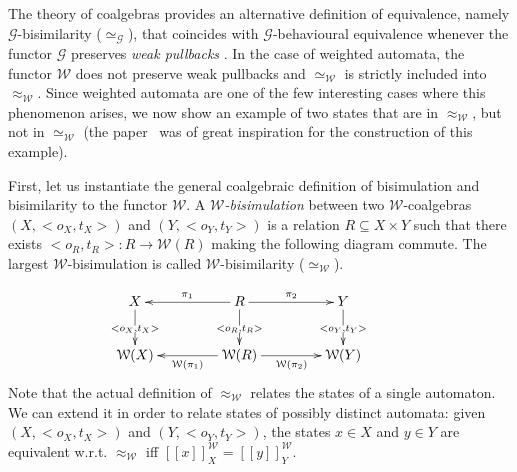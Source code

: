 \documentclass[3p]{elsarticle}
\newcommand{\cbox}[1]{\vspace{0.2cm}\noindent
  \fbox{\parbox{.97\textwidth}{#1}}\vspace{0.2cm}}
\newcommand{\fG}{\mathcal{G}}    %
\newcommand{\fW}{\mathcal{W}}    %
\newcommand{\setproduct}{\times} %
\newcommand{\beh}[3]{\left[\!\left[ #1 \right]\!\right]^{#2}_{#3}} %
\newcommand{\comp}{\circ}               %
\begin{document}
The theory of coalgebras provides an alternative definition of
equivalence, namely $\fG$-bisimilarity ($\simeq_\fG$), that
coincides with $\fG$-behavioural equivalence whenever the functor
$\fG$ preserves \emph{weak pullbacks} \cite{Rutten00}. In the case
of weighted automata, the functor $\fW$ does not preserve weak
pullbacks and $\simeq_\fW$ is strictly included into $\approx_\fW$.
%
Since weighted automata are one of the few interesting cases where
this phenomenon arises, we now show an example of two states that
are in $\approx_\fW$, but not in $\simeq_\fW$ (the paper~\cite{Gumm09}
was of great inspiration for the construction of this example).




%
First, let us instantiate the general coalgebraic definition of
bisimulation and bisimilarity to the functor $\fW$. A
\emph{$\fW$-bisimulation} between two $\fW$-coalgebras
$(X,<o_X,t_X>)$ and $(Y,<o_Y, t_Y>)$ is a relation $R\subseteq
X\setproduct Y$ such that there exists $<o_R,t_R>\colon R\to \fW(R)$
making the following diagram commute. The largest $\fW$-bisimulation
is called $\fW$-bisimilarity ($\simeq_\fW$).

%
\[
\xymatrix@C=1.5cm{X \ar[d]|{<o_X,t_X>}& R \ar[l]_{\pi_1} \ar[d]|{<o_R,t_R>} \ar[r]^{\pi_2}& Y\ar[d]|{<o_Y,t_Y>}\\
\fW(X) & \fW(R) \ar[l]^{\fW(\pi_1)} \ar[r]_{\fW(\pi_2)}& \fW(Y)}\ \
\ \ \ \ \ \ \
\]
%
Note that the actual definition of $\approx_{\fW}$ relates the states
of a single automaton. We can extend it in order to relate
states of possibly distinct automata: given $(X,<o_X,t_X>)$ and
$(Y,<o_Y,t_Y>)$, the states $x\in X$ and $y\in Y$ are equivalent w.r.t. $\approx_{\fW}$ iff
$\beh{x}{\fW}{X}=\beh{y}{\fW}{Y}$.
\end{document}

